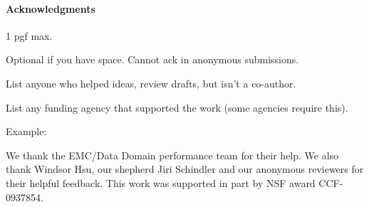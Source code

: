 \paragraph{Acknowledgments}
\label{ack}

1 pgf max.

Optional if you have space.  Cannot ack in anonymous
submissions.

List anyone who helped ideas, review drafts, but isn't a
co-author.

List any funding agency that supported the work (some agencies
require this).

Example:

We thank the EMC/Data Domain performance team for their help.  We also
thank Windsor Hsu, our shepherd Jiri Schindler and our anonymous
reviewers for their helpful feedback.  This work was supported in part
by NSF award CCF-0937854.



